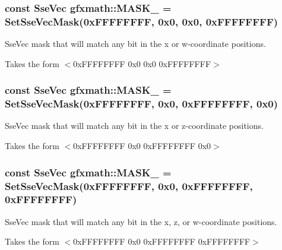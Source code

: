 \subsubsection[{M\+A\+S\+K\+\_\+1001}]{\setlength{\rightskip}{0pt plus 5cm}const {\bf Sse\+Vec} gfxmath\+::\+M\+A\+S\+K\+\_ = {\bf Set\+Sse\+Vec\+Mask}(0x\+F\+F\+F\+F\+F\+F\+F\+F, 0x0, 0x0, 0x\+F\+F\+F\+F\+F\+F\+F\+F)}\label{namespacegfxmath_a614228347cb24ffbda356c24735c1b3b}


Sse\+Vec mask that will match any bit in the x or w-\/coordinate positions. 

Takes the form $<$0x\+F\+F\+F\+F\+F\+F\+F\+F 0x0 0x0 0x\+F\+F\+F\+F\+F\+F\+F\+F$>$ \hypertarget{namespacegfxmath_aa01027212a31efde9054027b6a9c54de}{}
\subsubsection[{M\+A\+S\+K\+\_\+1010}]{\setlength{\rightskip}{0pt plus 5cm}const {\bf Sse\+Vec} gfxmath\+::\+M\+A\+S\+K\+\_ = {\bf Set\+Sse\+Vec\+Mask}(0x\+F\+F\+F\+F\+F\+F\+F\+F, 0x0, 0x\+F\+F\+F\+F\+F\+F\+F\+F, 0x0)}\label{namespacegfxmath_aa01027212a31efde9054027b6a9c54de}


Sse\+Vec mask that will match any bit in the x or z-\/coordinate positions. 

Takes the form $<$0x\+F\+F\+F\+F\+F\+F\+F\+F 0x0 0x\+F\+F\+F\+F\+F\+F\+F\+F 0x0$>$ \hypertarget{namespacegfxmath_aacb5eed4ebafce721c4db8d6358854f6}{}
\subsubsection[{M\+A\+S\+K\+\_\+1011}]{\setlength{\rightskip}{0pt plus 5cm}const {\bf Sse\+Vec} gfxmath\+::\+M\+A\+S\+K\+\_ = {\bf Set\+Sse\+Vec\+Mask}(0x\+F\+F\+F\+F\+F\+F\+F\+F, 0x0, 0x\+F\+F\+F\+F\+F\+F\+F\+F, 0x\+F\+F\+F\+F\+F\+F\+F\+F)}\label{namespacegfxmath_aacb5eed4ebafce721c4db8d6358854f6}


Sse\+Vec mask that will match any bit in the x, z, or w-\/coordinate positions. 

Takes the form $<$0x\+F\+F\+F\+F\+F\+F\+F\+F 0x0 0x\+F\+F\+F\+F\+F\+F\+F\+F 0x\+F\+F\+F\+F\+F\+F\+F\+F$>$ \hypertarget{namespacegfxmath_aa0a06e585eb58938ab3952d53c917737}{}
